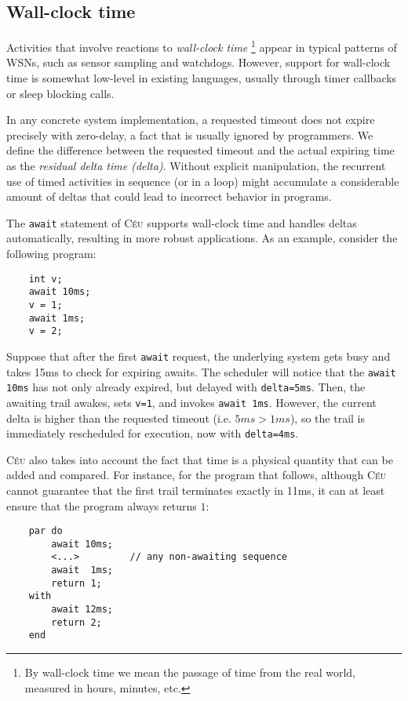\documentclass[10pt]{sensys-proc}
\newcommand{\CEU}{\textsc{C\'{e}u}\xspace}
\newcommand{\code}[1] {{\small{\texttt{#1}}}}
\begin{document}
\subsection{Wall-clock time}
\label{sec.ceu.time}

Activities that involve reactions to \emph{wall-clock time}%
\footnote{
By wall-clock time we mean the passage of time from the real world, measured in 
hours, minutes, etc.
}
appear in typical patterns of WSNs, such as sensor sampling and watchdogs.
However, support for wall-clock time is somewhat low-level in existing 
languages, usually through timer callbacks or sleep blocking calls.

In any concrete system implementation, a requested timeout does not expire 
precisely with zero-delay, a fact that is usually ignored by programmers.
We define the difference between the requested timeout and the actual expiring 
time as the \emph{residual delta time (delta)}.
Without explicit manipulation, the recurrent use of timed activities in 
sequence (or in a loop) might accumulate a considerable amount of deltas that 
could lead to incorrect behavior in programs.

The \code{await} statement of \CEU supports wall-clock time and handles deltas 
automatically, resulting in more robust applications.
As an example, consider the following program:

{\small
\begin{verbatim}
    int v;
    await 10ms;
    v = 1;
    await 1ms;
    v = 2;
\end{verbatim}
}

Suppose that after the first \code{await} request, the underlying system gets 
busy and takes 15ms to check for expiring awaits.
The scheduler will notice that the \code{await 10ms} has not only already 
expired, but delayed with \code{delta=5ms}.
Then, the awaiting trail awakes, sets \code{v=1}, and invokes \code{await 1ms}.
However, the current delta is higher than the requested timeout (i.e. $5ms > 
1ms$), so the trail is immediately rescheduled for execution, now with 
\code{delta=4ms}.

\CEU also takes into account the fact that time is a physical quantity that can 
be added and compared.
For instance, for the program that follows, although \CEU cannot guarantee that 
the first trail terminates exactly in 11ms, it can at least ensure that the 
program always returns $1$:

{\small
\begin{verbatim}
    par do
        await 10ms;
        <...>         // any non-awaiting sequence
        await  1ms;
        return 1;
    with
        await 12ms;
        return 2;
    end
\end{verbatim}
}
\end{document}
